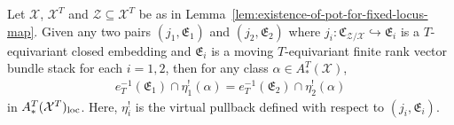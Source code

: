 \begin{lemma}\label{rl-000Y}\label{lem:independence-of-Res-map-from-choice}
  Let \(\mathcal X\), \(\mathcal X^T\) and \(\mathcal Z\subseteq\mathcal X^T\) be as in Lemma~\ref{lem:existence-of-pot-for-fixed-locus-map}. Given any two pairs \((j_1, \mathfrak E_1)\) and \((j_2,\mathfrak E_2)\) where \(j_i:\mathfrak C_{\mathcal Z/\mathcal X}\hookrightarrow \mathfrak E_i\) is a \(T\)-equivariant closed embedding and \(\mathfrak E_i\) is a moving \(T\)-equivariant finite rank vector bundle stack for each \(i=1,2\), then for any class \(\alpha\in A_*^T(\mathcal X)\),
  \begin{align*}
    e_T^{-1}(\mathfrak E_1)\cap \eta_1^!(\alpha) = e_T^{-1}(\mathfrak E_2)\cap \eta_2^!(\alpha)
  \end{align*}
  in \(A^T_*(\mathcal X^T)_{\operatorname{loc}}\). Here, \(\eta^!_i\) is the virtual pullback defined with respect to \((j_i,\mathfrak E_i)\).
\end{lemma}
